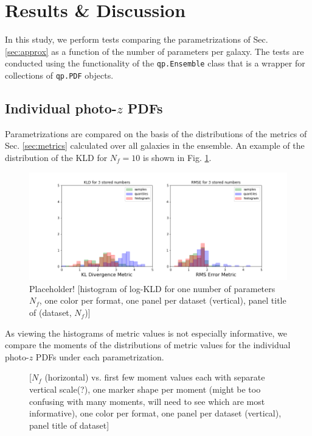 \documentclass[\docopts]{\docclass}
\newcommand{\pz}{photo-$z$ PDF}
\begin{document}
\section{Results \& Discussion}
\label{sec:results}


In this study, we perform tests comparing the parametrizations of Sec. 
\ref{sec:approx} as a function of the number of parameters per galaxy.  The 
tests are conducted using the functionality of the \texttt{qp.Ensemble} class 
that is a wrapper for collections of \texttt{qp.PDF} objects.

\subsection{Individual \pz s}
\label{sec:individual}

Parametrizations are compared on the basis of the distributions of the metrics 
of Sec. \ref{sec:metrics} calculated over all galaxies in the ensemble.  An 
example of the distribution of the KLD for $N_{f}=10$ is shown in Fig. 
\ref{fig:individual}.

\begin{figure}
  \includegraphics[width=0.9\columnwidth]{figures/individual_placeholder.png}
  \caption{Placeholder! [histogram of log-KLD for one number of parameters 
$N_{f}$, one color per format, one panel per dataset (vertical), panel title of 
(dataset, $N_{f}$)]
  \label{fig:individual}}
\end{figure}

As viewing the histograms of metric values is not especially informative, we 
compare the moments of the distributions of metric values for the individual 
\pz s under each parametrization.

\begin{figure}
  \caption{ [$N_{f}$ (horizontal) vs. first few 
moment values each with separate vertical scale(?), one marker shape per moment 
(might be too confusing with many moments, will need to see which are most 
informative), one color per format, one panel per dataset (vertical), panel 
title of dataset]
  \label{fig:moments}}
\end{figure}
\end{document}
